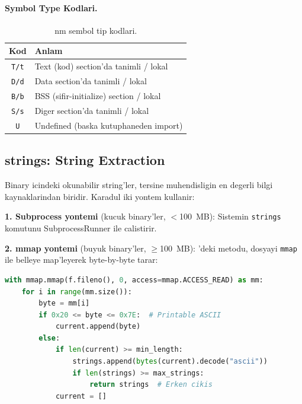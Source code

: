 \paragraph{Symbol Type Kodlari.}

\begin{table}[htbp]
\centering
\begin{tabular}{cl}
\toprule
\textbf{\color{sectioncyan}Kod} & \textbf{\color{sectioncyan}Anlam} \\
\midrule
\texttt{T/t} & Text (kod) section'da tanimli / lokal \\
\texttt{D/d} & Data section'da tanimli / lokal \\
\texttt{B/b} & BSS (sifir-initialize) section / lokal \\
\texttt{S/s} & Diger section'da tanimli / lokal \\
\texttt{U}   & Undefined (baska kutuphane\-den import) \\
\bottomrule
\end{tabular}
\caption{nm sembol tip kodlari.}
\label{tab:nm-types}
\end{table}

\subsection{strings: String Extraction}
\label{sec:strings-extraction}

Binary icindeki okunabilir string'ler, tersine muhendisligin en degerli bilgi kaynaklarindan biridir. Karadul iki yontem kullanir:

\textbf{1. Subprocess yontemi} (kucuk binary'ler, $<$100~MB): Sistemin \texttt{strings} komutunu SubprocessRunner ile calistirir.

\textbf{2. mmap yontemi} (buyuk binary'ler, $\geq$100~MB): 'deki  metodu, dosyayi \texttt{mmap} ile belleye map'leyerek byte-by-byte tarar:

\begin{lstlisting}[language=Python, caption={mmap ile string extraction}]
with mmap.mmap(f.fileno(), 0, access=mmap.ACCESS_READ) as mm:
    for i in range(mm.size()):
        byte = mm[i]
        if 0x20 <= byte <= 0x7E:  # Printable ASCII
            current.append(byte)
        else:
            if len(current) >= min_length:
                strings.append(bytes(current).decode("ascii"))
                if len(strings) >= max_strings:
                    return strings  # Erken cikis
            current = []
\end{lstlisting}

